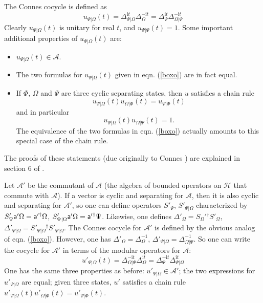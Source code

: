 \documentclass[11pt,a4paper]{article}
\def\a{{\sf a}}
\def\i{{\mathrm i}}
\def\be{\begin{equation}}
\def\ee{\end{equation}}
\def\A{{\mathcal A}}
\def\H{{\mathcal H}}
\begin{document}
  The Connes cocycle is defined as
\be\label{boxo} u_{\Psi|\Omega}(t) =\Delta_{\Psi|\Omega}^{\i t}  \Delta_{\Omega} ^{-\i t}  =\Delta_\Psi^{\i t}\Delta_{\Omega|\Psi}^{-\i t}  \ee
Clearly $u_{\Psi|\Omega}(t)$ is unitary for real $t$, and $u_{\Psi|\Psi}(t)=1$.
Some important  additional properties of $u_{\Psi|\Omega}(t)$ are:
\begin{itemize}
\item{$u_{\Psi|\Omega}(t)\in \A.$}
\item{The two formulas for $u_{\Psi|\Omega}(t)$ given in eqn. (\ref{boxo}) are in fact equal.}
\item{If $\Phi$, $\Omega$ and $\Psi$ are three cyclic separating states, then $u$ satisfies a chain rule 
\be\label{chain}u_{\Psi|\Omega}(t)u_{\Omega|\Phi}(t) =u_{\Psi|\Phi}(t) \ee 
and in particular
\be\label{lotto}u_{\Psi|\Omega}(t) u_{\Omega|\Psi}(t)=1. \ee 
The equivalence of the two formulas in eqn. (\ref{boxo})  actually amounts  to this special case of the chain rule.
} \end{itemize}
The proofs of these statements (due originally to Connes \cite{Connes}) are explained in section 6 of \cite{Lashkari}.

Let $\A'$ be the commutant of $\A$  (the algebra of bounded operators on $\H$ that commute with $\A$).   If a vector is cyclic and separating for $\A$, then  it is also cyclic
and separating for $\A'$, so one can define operators $S'_\Psi$, $S'_{\Psi|\Omega}$
 characterized by $S'_\Psi \a' \Omega=\a'{}^\dagger\Omega$, $S'_{\Psi|\Omega}\a'\Omega=\a'{}^\dagger
\Psi$.   Likewise, one defines $\Delta'_\Omega=S_\Omega'{}^\dagger S'_\Omega$, $\Delta'_{\Psi|\Omega}=S'_{\Psi|\Omega}{}^\dagger S'_{\Psi|\Omega}$.
The Connes cocycle for $\A'$ is defined by the obvious analog of eqn. (\ref{boxo}).    However, one has $\Delta'_\Omega=\Delta_\Omega^{-1}$,
$\Delta'_{\Psi|\Omega}=\Delta_{\Omega|\Psi}^{-1}$.   So one can write the cocycle for $\A'$ in terms of the modular operators for $\A$:
\be\label{noxo} u'_{\Psi|\Omega}(t) =\Delta_{\Omega|\Psi}^{-\i t}  \Delta_{\Omega} ^{\i t}  =\Delta_\Psi^{-\i t}\Delta_{\Psi|\Omega}^{\i t}  \ee
One has the same three properties as before: $u'_{\Psi|\Omega}\in\A'$; the two expressions for $u'_{\Psi|\Omega}$ are equal; given three states,
$u'$ satisfies a chain rule $u'_{\Psi|\Omega}(t)u'_{\Omega|\Phi}(t) =u'_{\Psi|\Phi}(t).$
\end{document}
